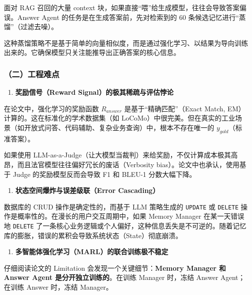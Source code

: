 面对 RAG 召回的大量 context 块，如果直接``喂''给生成模型，往往会导致答案偏误。Answer Agent 的任务是在生成答案前，先对检索到的 60 条候选记忆进行``蒸馏''（过滤去噪）。

这种蒸馏策略不是基于简单的向量相似度，而是通过强化学习、以结果为导向训练出来的。它确保模型只关注能推导出正确答案的核心信息。

\hypertarget{ux4e8cux5de5ux7a0bux96beux70b9}{%
\subsubsection{（二）工程难点}\label{ux4e8cux5de5ux7a0bux96beux70b9}}

\begin{enumerate}
\def\labelenumi{\arabic{enumi}.}
\tightlist
\item
  \textbf{奖励信号（Reward Signal）的极其稀疏与评估悖论}
\end{enumerate}

在论文中，强化学习的奖励函数 \(R_{answer}\) 是基于``精确匹配''（Exact Match, EM）计算的。这在标准化的学术数据集（如 LoCoMo）中很完美。但在真实的工业场景（如开放式问答、代码辅助、复杂业务查询）中，根本不存在唯一的 \(y_{gold}\)（标准答案）。

如果使用 LLM-as-a-Judge（让大模型当裁判）来给奖励，不仅计算成本极其高昂，而且法官模型往往偏好冗长的废话（Verbosity bias）。论文中也承认，使用基于 Judge 的奖励模型反而会导致 F1 和 BLEU-1 分数大幅下降。

\begin{enumerate}
\def\labelenumi{\arabic{enumi}.}
\setcounter{enumi}{1}
\tightlist
\item
  \textbf{状态空间爆炸与误差级联（Error Cascading）}
\end{enumerate}

数据库的 CRUD 操作是确定性的，而基于 LLM 策略生成的 \texttt{UPDATE} 或 \texttt{DELETE} 操作是概率性的。在漫长的用户交互周期中，如果 Memory Manager 在某一天错误地 \texttt{DELETE} 了一条核心业务逻辑或个人偏好，这种信息丢失是不可逆的。随着记忆库的膨胀，错误的累积会导致系统状态（State）彻底崩溃。

\begin{enumerate}
\def\labelenumi{\arabic{enumi}.}
\setcounter{enumi}{2}
\tightlist
\item
  \textbf{多智能体强化学习（MARL）的联合训练极不稳定}
\end{enumerate}

仔细阅读论文的 Limitation 会发现一个关键细节：\textbf{Memory Manager 和 Answer Agent 是分开独立训练的}。在训练 Manager 时，冻结 Answer Agent；在训练 Answer 时，冻结 Manager。

